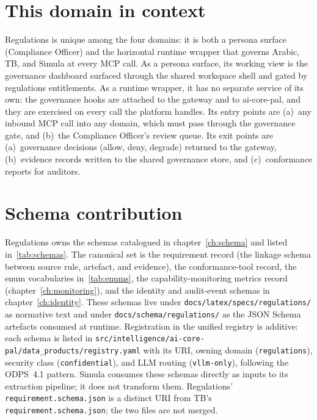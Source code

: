 \section{This domain in context}
\label{sec:agent-domain-context}
Regulations is unique among the four domains: it is both a persona
surface (Compliance Officer) and the horizontal runtime wrapper that
governs Arabic, TB, and Simula at every MCP call. As a persona
surface, its working view is the governance dashboard surfaced
through the shared workspace shell and gated by regulations
entitlements. As a runtime wrapper, it has no separate service of
its own: the governance hooks are attached to the gateway and to
ai-core-pal, and they are exercised on every call the platform
handles. Its entry points are (a)~any inbound MCP call into any
domain, which must pass through the governance gate, and (b)~the
Compliance Officer's review queue. Its exit points are
(a)~governance decisions (allow, deny, degrade) returned to the
gateway, (b)~evidence records written to the shared governance
store, and (c)~conformance reports for auditors.

\section{Schema contribution}
\label{sec:agent-schema-contrib}
Regulations owns the schemas catalogued in chapter~\ref{ch:schema}
and listed in~\ref{tab:schemas}. The canonical set is the
requirement record (the linkage schema between source rule, artefact,
and evidence), the conformance-tool record, the enum vocabularies
in~\ref{tab:enums}, the capability-monitoring metrics record
(chapter~\ref{ch:monitoring}), and the identity and audit-event
schemas in chapter~\ref{ch:identity}. These schemas live under
\texttt{docs/latex/specs/regulations/} as normative text and under
\texttt{docs/schema/regulations/} as the JSON Schema artefacts consumed at
runtime. Registration in the unified registry is additive: each
schema is listed in
\texttt{src/intelligence/ai-core-pal/data\_products/registry.yaml}
with its URI, owning domain (\texttt{regulations}), security class
(\texttt{confidential}), and LLM routing (\texttt{vllm-only}),
following the ODPS~4.1 pattern. Simula consumes these schemas
directly as inputs to its extraction pipeline; it does not transform
them. Regulations' \texttt{requirement.schema.json} is a distinct
URI from TB's \texttt{requirement.schema.json}; the two files are
not merged.

